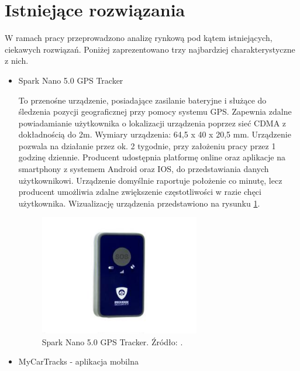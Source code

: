 \section{Istniejące rozwiązania}

W ramach pracy przeprowadzono analizę rynkową pod kątem istniejących, ciekawych rozwiązań. Poniżej zaprezentowano trzy najbardziej charakterystyczne z nich.

\begin{itemize}
\item Spark Nano 5.0 GPS Tracker

To przenośne urządzenie, posiadające zasilanie bateryjne i służące do śledzenia pozycji geograficznej przy pomocy systemu GPS. Zapewnia zdalne powiadamianie użytkownika o lokalizacji urządzenia poprzez sieć CDMA z dokładnością do 2m. Wymiary urządzenia: 64,5 x 40 x 20,5 mm. Urządzenie pozwala na działanie przez ok. 2 tygodnie, przy założeniu pracy przez 1 godzinę dziennie. Producent udostępnia platformę online oraz aplikacje na smartphony z systemem Android oraz IOS, do przedstawiania danych użytkownikowi. Urządzenie domyślnie raportuje położenie co minutę, lecz producent umożliwia zdalne zwiększenie częstotliwości w razie chęci użytkownika. Wizualizację urządzenia przedstawiono na rysunku \ref{fig:image_spark_nano_tracker}.
\begin{figure}[h]
	\centering
	\includegraphics[width=7cm]{img/introduction/spark_nano.jpg}
	\caption{Spark Nano 5.0 GPS Tracker. Źródło: \cite{spark_nano}.}
	\label{fig:image_spark_nano_tracker}
\end{figure}

\item MyCarTracks - aplikacja mobilna


\end{itemize}
